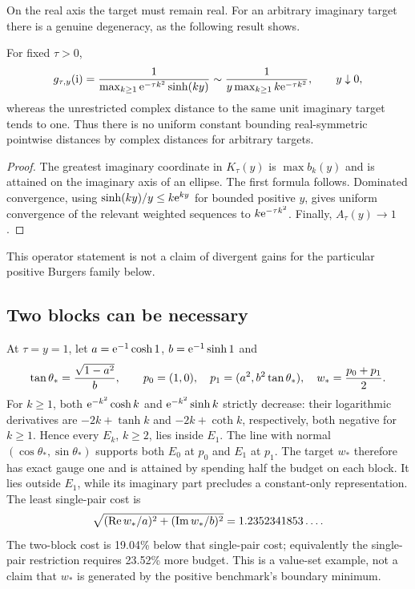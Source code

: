 \documentclass[11pt]{article}
\begin{document}
On the real axis the target must remain real. For an arbitrary imaginary target there is a genuine degeneracy, as the following result shows.

\begin{proposition}\label{prop:gap}
For fixed $\tau>0$,
\begin{equation}
 g_{\tau,y}(\mathrm i)=\frac{1}{\max_{k\ge1}\mathrm e^{-\tau k^2}\sinh(ky)}
 \sim \frac{1}{y\max_{k\ge1}k\mathrm e^{-\tau k^2}},\qquad y\downarrow0,
\end{equation}
whereas the unrestricted complex distance to the same unit imaginary target tends to one. Thus there is no uniform constant bounding real-symmetric pointwise distances by complex distances for arbitrary targets.
\end{proposition}
\begin{proof}
The greatest imaginary coordinate in $K_\tau(y)$ is $\max b_k(y)$ and is attained on the imaginary axis of an ellipse. The first formula follows. Dominated convergence, using $\sinh(ky)/y\le k\mathrm e^{ky}$ for bounded positive $y$, gives uniform convergence of the relevant weighted sequences to $k\mathrm e^{-\tau k^2}$. Finally, $A_\tau(y)\to1$.
\end{proof}
This operator statement is not a claim of divergent gains for the particular positive Burgers family below.

\subsection{Two blocks can be necessary}
At $\tau=y=1$, let $a=\mathrm e^{-1}\cosh1$, $b=\mathrm e^{-1}\sinh1$ and
\begin{equation}\label{eq:two}
 \tan\theta_*={\sqrt{1-a^2}\over b},\qquad
 p_0=(1,0),\quad p_1=(a^2,b^2\tan\theta_*),\quad w_*={p_0+p_1\over2}.
\end{equation}
For $k\ge1$, both $\mathrm e^{-k^2}\cosh k$ and $\mathrm e^{-k^2}\sinh k$ strictly decrease: their logarithmic derivatives are $-2k+\tanh k$ and $-2k+\coth k$, respectively, both negative for $k\ge1$. Hence every $E_k$, $k\ge2$, lies inside $E_1$. The line with normal $(\cos\theta_*,\sin\theta_*)$ supports both $E_0$ at $p_0$ and $E_1$ at $p_1$. The target $w_*$ therefore has exact gauge one and is attained by spending half the budget on each block. It lies outside $E_1$, while its imaginary part precludes a constant-only representation. The least single-pair cost is
\begin{equation}
 \sqrt{(\operatorname{Re} w_*/a)^2+(\operatorname{Im} w_*/b)^2}=1.2352341853\ldots.
\end{equation}
The two-block cost is 19.04\% below that single-pair cost; equivalently the single-pair restriction requires 23.52\% more budget. This is a value-set example, not a claim that $w_*$ is generated by the positive benchmark's boundary minimum.
\end{document}
